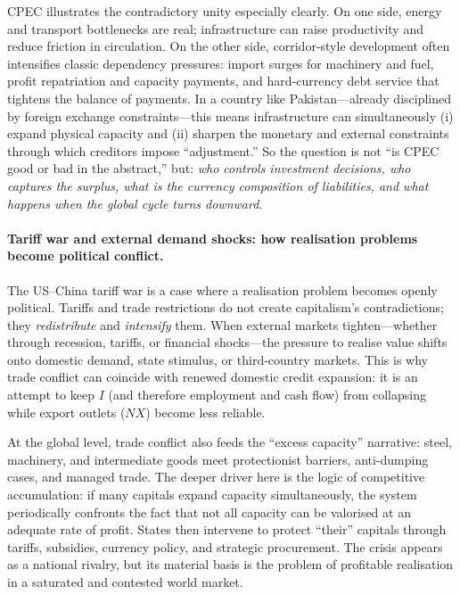 CPEC illustrates the contradictory unity especially clearly.
On one side, energy and transport bottlenecks are real; infrastructure can raise productivity
and reduce friction in circulation.
On the other side, corridor-style development often intensifies classic dependency pressures:
import surges for machinery and fuel, profit repatriation and capacity payments,
and hard-currency debt service that tightens the balance of payments.\cite{IMFPakistan2026}
In a country like Pakistan---already disciplined by foreign exchange constraints---this means
infrastructure can simultaneously (i) expand physical capacity and (ii) sharpen the monetary
and external constraints through which creditors impose “adjustment.”
So the question is not “is CPEC good or bad in the abstract,” but:
\emph{who controls investment decisions, who captures the surplus, what is the currency
composition of liabilities, and what happens when the global cycle turns downward.}

\paragraph{Tariff war and external demand shocks: how realisation problems become political conflict.}
The US--China tariff war is a case where a realisation problem becomes openly political.
Tariffs and trade restrictions do not create capitalism’s contradictions; they \emph{redistribute}
and \emph{intensify} them.
When external markets tighten---whether through recession, tariffs, or financial shocks---the
pressure to realise value shifts onto domestic demand, state stimulus, or third-country
markets.
This is why trade conflict can coincide with renewed domestic credit expansion:
it is an attempt to keep $I$ (and therefore employment and cash flow) from collapsing
while export outlets ($NX$) become less reliable.

At the global level, trade conflict also feeds the “excess capacity” narrative:
steel, machinery, and intermediate goods meet protectionist barriers, anti-dumping cases,
and managed trade.
The deeper driver here is the logic of competitive accumulation:
if many capitals expand capacity simultaneously, the system periodically confronts the fact
that not all capacity can be valorised at an adequate rate of profit.
States then intervene to protect “their” capitals through tariffs, subsidies, currency policy,
and strategic procurement.
The crisis appears as a national rivalry, but its material basis is the problem of profitable
realisation in a saturated and contested world market.

